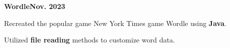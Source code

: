 \documentclass[letterpaper,10pt]{article}
\newcommand{\heading}[2]{
  \hspace{10pt}#1\hfill#2\\
}
\newcommand{\headingBf}[2]{
  \heading{\textbf{#1}}{\textbf{#2}}
}
\newenvironment{resume_list}{
  \vspace{-7pt}
  \begin{itemize}[itemsep=-2px, parsep=1pt, leftmargin=30pt]
}{
  \end{itemize}
}
\begin{document}
\vspace{0pt}
\headingBf{\large{Wordle}}{Nov. 2023}
\begin{resume_list}
  \item Recreated the popular game New York Times game Wordle using \textbf{Java}.
  \vspace{1pt}
  \item Utilized \textbf{file reading} methods to customize word data.
\end{resume_list}
\end{document}
